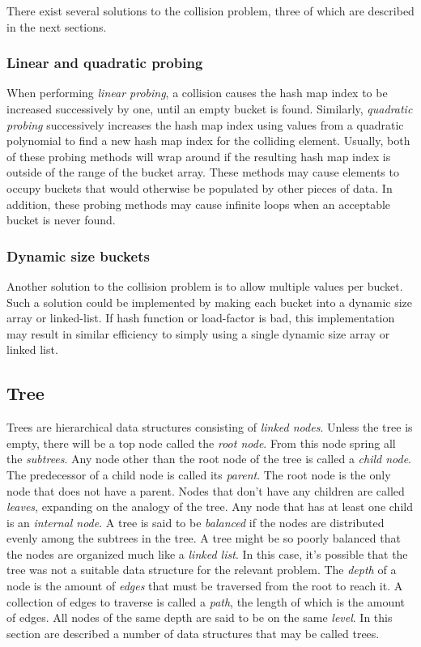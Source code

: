 \documentclass{article}
\begin{document}
{There exist several solutions to the collision problem, three of which are described in the next sections.

\subsubsection{Linear and quadratic probing}
When performing {\em linear probing}, a collision causes the hash map index to be increased successively by one,
until an empty bucket is found. Similarly, {\em quadratic probing} successively increases the hash map index using
values from a quadratic polynomial to find a new hash map index for the colliding element.
Usually, both of these probing methods will wrap around if the resulting hash map index is outside of the range
of the bucket array. These methods may cause elements to occupy buckets that would otherwise be populated by
other pieces of data. In addition, these probing methods may cause infinite loops when an acceptable bucket is
never found.

\subsubsection{Dynamic size buckets}
Another solution to the collision problem is to allow multiple values per bucket. Such a solution could be
implemented by making each bucket into a dynamic size array or linked-list. If hash function or load-factor is bad,
this implementation may result in similar efficiency to simply using a single dynamic size array or linked list.




\subsection{Tree}
Trees are hierarchical data structures consisting of {\em linked nodes}. Unless the tree is empty, there will be a
top node called the {\em root node}. From this node spring all the {\em subtrees}. Any node other than the root node
of the tree is called a {\em child node}. The predecessor of a child node is called its {\em parent}. The root node
is the only node that does not have a parent. Nodes that don't have any children are called {\em leaves}, expanding
on the analogy of the tree. Any node that has at least one child is an {\em internal node}. A tree is said to be
{\em balanced} if the nodes are distributed evenly among the subtrees in the tree. A tree might be so poorly
balanced that the nodes are organized much like a {\em linked list}. In this case, it's possible that the tree was
not a suitable data structure for the relevant problem. The {\em depth} of a node is the amount of {\em edges} that
must be traversed from the root to reach it. A collection of edges to traverse is called a {\em path}, the length of
which is the amount of edges. All nodes of the same depth are said to be on the same {\em level}.
In this section are described a number of data structures that may be called trees.


}
\end{document}
